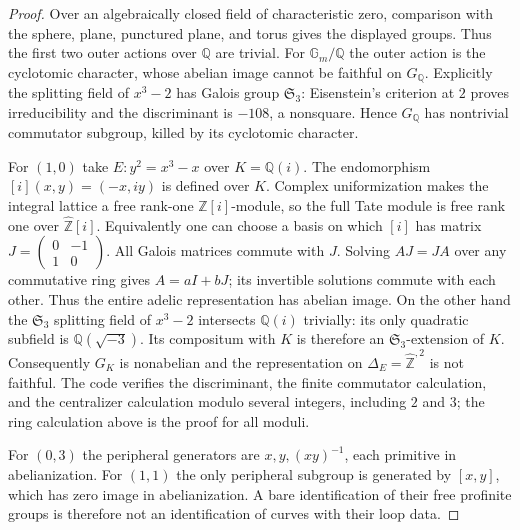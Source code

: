 \begin{proof}
Over an algebraically closed field of characteristic zero, comparison with
the sphere, plane, punctured plane, and torus gives the displayed groups.
Thus the first two outer actions over $\mathbb Q$ are trivial.  For
$\mathbb G_m/\mathbb Q$ the outer action is the cyclotomic character, whose
abelian image cannot be faithful on $G_{\mathbb Q}$.  Explicitly the splitting
field of $x^3-2$ has Galois group $\mathfrak S_3$: Eisenstein's criterion at
$2$ proves irreducibility and the discriminant is $-108$, a nonsquare.
Hence $G_{\mathbb Q}$ has nontrivial commutator subgroup, killed by its
cyclotomic character.

For $(1,0)$ take $E:y^2=x^3-x$ over $K=\mathbb Q(i)$.
The endomorphism $[i](x,y)=(-x,iy)$ is defined over $K$.
Complex uniformization makes the integral lattice a free rank-one
$\mathbb Z[i]$-module, so the full Tate module is free rank one over
$\widehat{\mathbb Z}[i]$.  Equivalently one can choose a basis on which $[i]$
has matrix $J=\left(\begin{smallmatrix}0&-1\\1&0\end{smallmatrix}\right)$.
All Galois matrices commute with $J$.  Solving $AJ=JA$ over any commutative
ring gives $A=aI+bJ$; its invertible solutions commute with each other.
Thus the entire adelic representation has abelian image.  On the other hand
the $\mathfrak S_3$ splitting field of $x^3-2$ intersects $\mathbb Q(i)$
trivially: its only quadratic subfield is $\mathbb Q(\sqrt{-3})$.
Its compositum with $K$ is therefore an $\mathfrak S_3$-extension of $K$.
Consequently $G_K$ is nonabelian and the representation on
$\Delta_E=\widehat{\mathbb Z}^{,2}$ is not faithful.  The code verifies the
discriminant, the finite commutator calculation, and the centralizer
calculation modulo several integers, including $2$ and $3$; the ring
calculation above is the proof for all moduli.

For $(0,3)$ the peripheral generators are $x,y,(xy)^{-1}$, each primitive
in abelianization.  For $(1,1)$ the only peripheral subgroup is generated
by $[x,y]$, which has zero image in abelianization.  A bare identification
of their free profinite groups is therefore not an identification of curves
with their loop data.
\end{proof}

